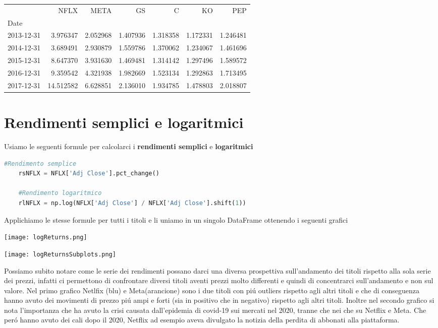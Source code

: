 \documentclass{report}
\begin{document}
\begin{tabular}{lrrrrrr}
\toprule
{} &       NFLX &      META &        GS &         C &        KO &       PEP \\
Date       &            &           &           &           &           &           \\
\midrule
2013-12-31 &   3.976347 &  2.052968 &  1.407936 &  1.318358 &  1.172331 &  1.246481 \\
2014-12-31 &   3.689491 &  2.930879 &  1.559786 &  1.370062 &  1.234067 &  1.461696 \\
2015-12-31 &   8.647370 &  3.931630 &  1.469481 &  1.314142 &  1.297496 &  1.589572 \\
2016-12-31 &   9.359542 &  4.321938 &  1.982669 &  1.523134 &  1.292863 &  1.713495 \\
2017-12-31 &  14.512582 &  6.628851 &  2.136010 &  1.934785 &  1.478803 &  2.018807 \\
\bottomrule
\end{tabular}

\section{Rendimenti semplici e logaritmici}
Usiamo le seguenti formule per calcolarci i \textbf{rendimenti semplici} e \textbf{logaritmici}
\begin{lstlisting}[language=python]
    #Rendimento semplice
    rsNFLX = NFLX['Adj Close'].pct_change()
    
    #Rendimento logaritmico
    rlNFLX = np.log(NFLX['Adj Close'] / NFLX['Adj Close'].shift(1))
\end{lstlisting}
Applichiamo le stesse formule per tutti i titoli e li uniamo in un singolo DataFrame ottenendo i seguenti grafici

\texttt{[image: logReturns.png]}

\texttt{[image: logReturnsSubplots.png]}

Possiamo subito notare come le serie dei rendimenti possano darci una diversa prospettiva sull'andamento dei titoli rispetto alla sola serie dei prezzi, infatti ci permettono di confrontare diversi titoli aventi prezzi molto differenti e quindi di concentrarci sull'andamento e non sul valore. Nel primo grafico Netlfix (blu) e Meta(arancione) sono i due titoli con piú outliers rispetto agli altri titoli e che di conseguenza hanno avuto dei movimenti di prezzo  piú ampi e forti (sia in positivo che in negativo) rispetto agli altri titoli. Inoltre nel secondo grafico si nota l'importanza che ha avuto la crisi causata dall'epidemia di covid-19 sui mercati nel 2020, tranne che nei che su Netflix e Meta. Che peró hanno avuto dei cali dopo il 2020, Netflix ad esempio aveva divulgato la notizia della perdita di abbonati alla piattaforma.
\end{document}
